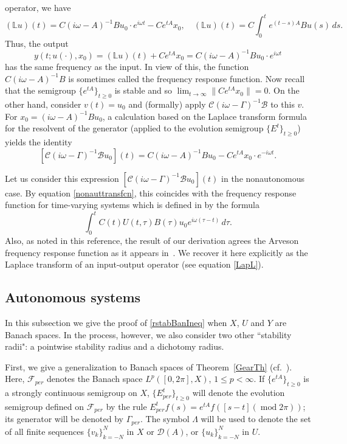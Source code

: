 \documentclass[10pt,psamsfonts,leqno]{siamltex}
\newcommand{\bbL}{\mathbb{L}}
\newcommand{\calB}{\mathcal{B}}
\newcommand{\calC}{\mathcal{C}}
\newcommand{\calD}{\mathcal{D}}
\renewcommand{\mod}{\operatorname{mod}}
\newcommand{\Gammaper}{\Gamma_{per}}
\newcommand{\Fper}{{\mathcal{F}_{per}}}
\begin{document}
operator, we have
\begin{equation*}\label{freq}
(\bbL u)(t)=C(i\omega-A)^{-1}B u_0\cdot e^{i\omega t}-Ce^{tA}x_0,
\quad (\bbL u)(t)=C\int_0^te^{(t-s)A}Bu(s)\,ds.
\end{equation*}
Thus, the output
$$
y(t;u(\cdot),x_0)=(\bbL u)(t)+Ce^{tA}x_0=
C(i\omega-A)^{-1}B u_0\cdot e^{i\omega t}
$$
has the same frequency  as the input.  In view of this, the function
$C(i\omega-A)^{-1}B$ is sometimes called the frequency response
function.  Now recall that the semigroup $\{e^{tA}\}_{t\ge0}$ is
stable and so $\lim_{t\to\infty}\|Ce^{tA}x_0\|=0$.  On the other hand,
consider $v(t)=u_0$ and (formally) apply
$\calC(i\omega-\Gamma)^{-1}\calB$ to this $v$.
For $x_0=(i\omega-A)^{-1}Bu_0$, a calculation based on the Laplace
transform formula for the resolvent of the generator (applied to the
evolution
semigroup $\{E^t\}_{t\ge0}$) yields the identity
$$\left[\calC(i\omega-\Gamma)^{-1}\calB u_0\right](t)=
C(i\omega-A)^{-1}B u_0-Ce^{tA}x_0\cdot e^{-i\omega t}.
$$

Let us consider this expression
$[\calC(i\omega-\Gamma)^{-1}\calB u_0](t)$ in the nonautonomous case.
By equation \eqref{nonauttransfcn},
this coincides with the frequency response function for time-varying
systems which is  defined in \cite[Corollary~3.2]{BGK}  by the formula
$$
\int_0^t C(t)U(t,\tau) B(\tau)u_0 e^{i\omega (\tau-t)}\,d\tau.
$$
Also, as noted in this reference, the result of our derivation agrees
 the Arveson frequency response function as
it appears in~\cite{SK}.  We recover it here explicitly as the Laplace
transform of an input-output operator (see equation \eqref{LapL}).

\subsection{Autonomous systems}\label{AUTsubsection} %

In this subsection we give the proof of \eqref{rstabBanIneq}
 when  $X$, $U$ and $Y$ are Banach spaces.  In the process, however, we
also
consider two other ``stability radii": a pointwise stability radius and
a dichotomy radius.

First, we give a generalization to Banach spaces of
Theorem~\ref{GearTh} (cf.~\cite{LMS2}).  Here,
$\Fper$ denotes the Banach space $L^p([0,2\pi],X)$, $1\le
p<\infty$.
If $\{e^{tA}\}_{t\ge0}$ is a strongly continuous
semigroup on $X$, $\{E_{per}^t\}_{t\ge0}$
will denote the evolution semigroup defined on $\Fper$ by the rule
$E^t_{per}f(s)=e^{tA}f([s-t](\mod 2\pi))$;  its generator will be
denoted by $\Gammaper$.  The symbol
$\Lambda$ will be used to denote the set of all finite sequences
$\{v_k\}_{k=-N}^N$ in $X$ or $\calD(A)$, or $\{u_k\}_{k=-N}^N$ in $U$.
\end{document}
